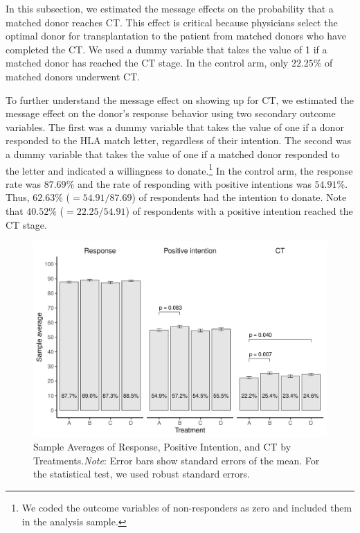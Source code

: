 \documentclass[12pt, a4paper]{article}
\begin{document}
In this subsection, we estimated the message effects on the probability that a matched donor reaches CT. This effect is critical because physicians select the optimal donor for transplantation to the patient from matched donors who have completed the CT. We used a dummy variable that takes the value of 1 if a matched donor has reached the CT stage. In the control arm, only \(22.25\)\% of matched donors underwent CT.

To further understand the message effect on showing up for CT, we estimated the message effect on the donor's response behavior using two secondary outcome variables. The first was a dummy variable that takes the value of one if a donor responded to the HLA match letter, regardless of their intention. The second was a dummy variable that takes the value of one if a matched donor responded to the letter and indicated a willingness to donate.\footnote{We coded the outcome variables of non-responders as zero and included them in the analysis sample.} In the control arm, the response rate was \(87.69\)\% and the rate of responding with positive intentions was \(54.91\)\%. Thus, \(62.63\)\% (\(=54.91/87.69\)) of respondents had the intention to donate. Note that \(40.52\)\% (\(=22.25/54.91\)) of respondents with a positive intention reached the CT stage.

\begin{figure}[t]
\includegraphics{JMDP RCT - Main Document_files/figure-latex/stock-diff-mean-1} \caption{Sample Averages of Response, Positive Intention, and CT by Treatments.\newline \emph{Note}: Error bars show standard errors of the mean. For the statistical test, we used robust standard errors.}\label{fig:stock-diff-mean}
\end{figure}
\end{document}
